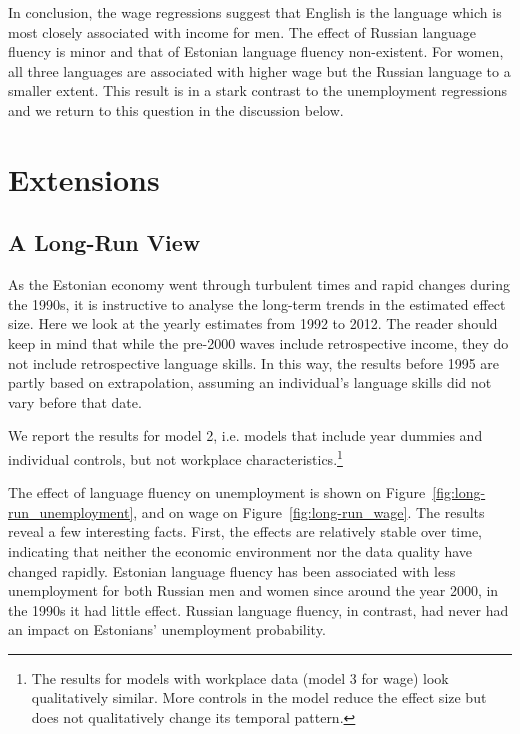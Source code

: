 \documentclass[12pt, a4paper]{article}
\begin{document}
In conclusion, the wage regressions suggest that English is the
language which is most closely associated with income for men. The effect of Russian language fluency is minor and
that of Estonian language fluency non-existent. For women, all three languages are
associated with higher wage but the Russian language to a smaller extent.
This result is in a stark contrast to the unemployment regressions and we return to
this question in the discussion below.


\section{Extensions}
\label{sec:extensions}

\subsection{A Long-Run View}
\label{sec:long-run}              

As the Estonian economy went through turbulent times and rapid changes
during the 1990s, it is instructive to analyse the long-term
trends in the estimated effect size. Here we look at the yearly estimates from 1992 to 2012.
The reader should keep in mind that while the pre-2000 waves include retrospective income, they do not include retrospective language skills. In this way, the results before
1995 are partly based on extrapolation, assuming an individual's language
skills did not vary before that date.

We report the results for model 2, i.e. models that include year
dummies and individual controls, but not workplace
characteristics.\footnote{The results for models with workplace data (model
 3 for wage)
 look qualitatively similar. More controls in the model reduce the effect size but does not qualitatively
 change its temporal pattern.}

The effect of language fluency on unemployment is shown on
Figure~\ref{fig:long-run_unemployment}, and on wage on
Figure~\ref{fig:long-run_wage}.
The results reveal a few interesting facts. First, the effects are
relatively stable over time, indicating that neither the economic
environment nor the data quality have changed rapidly. Estonian language
fluency has been associated with less unemployment for both Russian men and
women since around the year 2000, in the 1990s it had little effect. Russian language fluency,
in contrast, had never had an impact on Estonians' unemployment probability.
\end{document}
